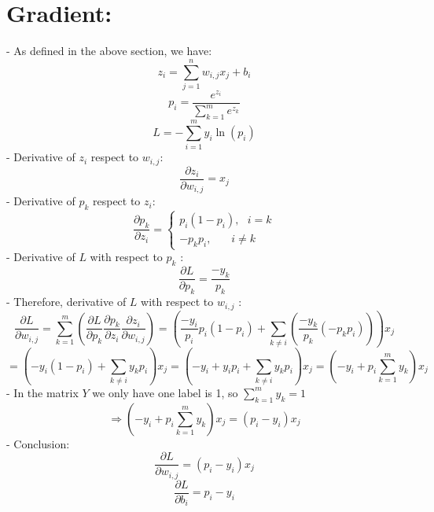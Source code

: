 \documentclass{article}
\begin{document}
    \section*{Gradient:}  
    - As defined in the above section, we have:
    \[
        z_i = \sum_{j = 1}^{n}w_{i, j}x_j + b_i
    \]
    \[
        p_i = \frac{e^{z_i}}{\sum_{k = 1}^{m}e^{z_k}}
    \]
    \[
        L = -\sum_{i = 1}^{m}y_i\ln\left(p_i\right)
    \]
    - Derivative of $z_i$ respect to $w_{i, j}$:
    \[
        \frac{\partial z_i}{\partial w_{i, j}} = x_j
    \]
    - Derivative of $p_k$ respect to $z_i$:
    \[
        \frac{\partial p_k}{\partial z_i} = 
        \begin{cases}
            p_i(1-p_i), \ \ \ i = k \\
            -p_kp_i, \ \ \ \ \ \ \ \ i \neq  k
        \end{cases}
    \]
    - Derivative of $L$ with respect to $p_k$ :
    \[
        \frac{\partial L}{\partial p_k} = 
        \frac{-y_k}{p_k}
    \]
    - Therefore, derivative of $L$ with respect to $w_{i, j}$ :
    \[
        \frac{\partial L}{\partial w_{i, j}} = 
        \sum_{k = 1}^{m}\left(
            \frac{\partial L}{\partial p_k}
            \frac{\partial p_k}{\partial z_i}
            \frac{\partial z_i}{\partial w_{i, j}}
        \right) =
        \left(
            \frac{-y_i}{p_i}p_i(1-p_i) + 
            \sum_{k \neq i}\left(\frac{-y_k}{p_k}(-p_kp_i)\right)
        \right) x_j
    \]
    \[
        = \left(
            -y_i(1-p_i) + \sum_{k \neq i}y_kp_i
        \right)x_j = 
        \left(
            -y_i + y_ip_i + \sum_{k \neq i}y_kp_i
        \right)x_j = 
        \left(
            -y_i + p_i\sum_{k = 1}^{m}y_k
        \right)x_j
    \]
    - In the matrix $Y$ we only have one label is 1, so $\sum_{k = 1}^{m}y_k = 1$ 
    \[
        \Rightarrow \left(
            -y_i + p_i\sum_{k = 1}^{m}y_k
        \right)x_j = (p_i - y_i)x_j
    \]
    - Conclusion:
    \[
        \frac{\partial L}{\partial w_{i, j}} = (p_i - y_i)x_j
    \]
    \[
        \frac{\partial L}{\partial b_i} = p_i - y_i
    \]
\end{document}
